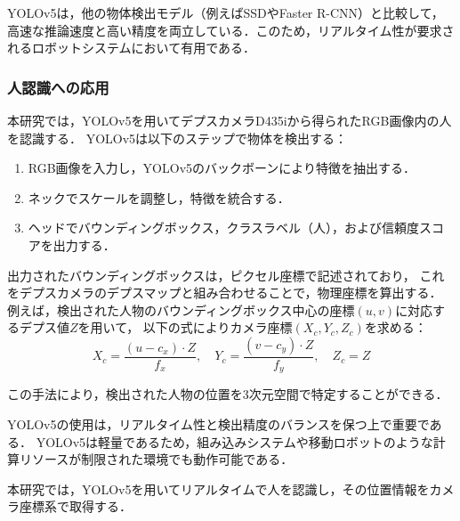 YOLOv5は，他の物体検出モデル（例えばSSDやFaster R-CNN）と比較して，
高速な推論速度と高い精度を両立している．このため，リアルタイム性が要求されるロボットシステムにおいて有用である．

\subsubsection{人認識への応用}
本研究では，YOLOv5を用いてデプスカメラD435iから得られたRGB画像内の人を認識する．
YOLOv5は以下のステップで物体を検出する：
\begin{enumerate}
    \item RGB画像を入力し，YOLOv5のバックボーンにより特徴を抽出する．
    \item ネックでスケールを調整し，特徴を統合する．
    \item ヘッドでバウンディングボックス，クラスラベル（人），および信頼度スコアを出力する．
\end{enumerate}

出力されたバウンディングボックスは，ピクセル座標で記述されており，
これをデプスカメラのデプスマップと組み合わせることで，物理座標を算出する．
例えば，検出された人物のバウンディングボックス中心の座標$(u, v)$に対応するデプス値$Z$を用いて，
以下の式によりカメラ座標$(X_c, Y_c, Z_c)$を求める：
\begin{equation}
    X_c = \frac{(u - c_x) \cdot Z}{f_x}, \quad
    Y_c = \frac{(v - c_y) \cdot Z}{f_y}, \quad
    Z_c = Z
\end{equation}

この手法により，検出された人物の位置を3次元空間で特定することができる．

YOLOv5の使用は，リアルタイム性と検出精度のバランスを保つ上で重要である．
YOLOv5は軽量であるため，組み込みシステムや移動ロボットのような計算リソースが制限された環境でも動作可能である．

本研究では，YOLOv5を用いてリアルタイムで人を認識し，その位置情報をカメラ座標系で取得する．
